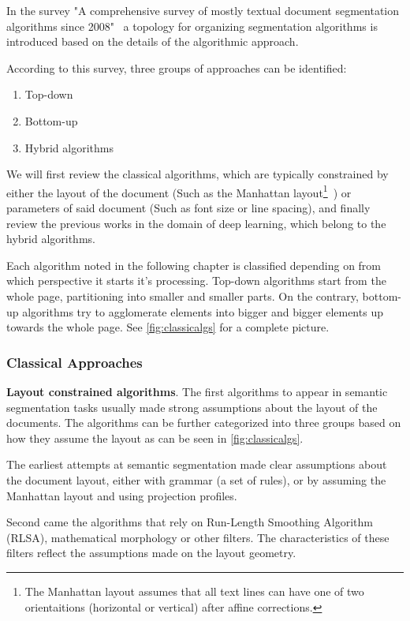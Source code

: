 \documentclass[oneside, english, bibtex]{kththesis}
\begin{document}
In the survey "A comprehensive survey of mostly textual document segmentation algorithms since 2008"~\cite{ESKENAZI20171} a topology for organizing segmentation algorithms is introduced based on the details of the algorithmic approach.

According to this survey, three groups of approaches can be identified:

\begin{enumerate}
\item Top-down
\item Bottom-up
\item Hybrid algorithms
\end{enumerate}

We will first review the classical algorithms, which are typically constrained by either the layout of the document (Such as the Manhattan layout\footnote{The Manhattan layout assumes that all text lines can have one of two orientaitions (horizontal or vertical) after affine corrections.}~\cite{395720}) or parameters of said document (Such as font size or line spacing), and finally review the previous works in the domain of deep learning, which belong to the hybrid algorithms.

Each algorithm noted in the following chapter is classified depending on from which perspective it starts it's processing. Top-down algorithms start from the whole page, partitioning into smaller and smaller parts. On the contrary, bottom-up algorithms try to agglomerate elements into bigger and bigger elements up towards the whole page. See \autoref{fig:classicalgs} for a complete picture.

\subsubsection{Classical Approaches}

\textbf{Layout constrained algorithms}. The first algorithms to appear in semantic segmentation tasks usually made strong assumptions about the layout of the documents. The algorithms can be further categorized into three groups based on how they assume the layout as can be seen in \autoref{fig:classicalgs}.

The earliest attempts at semantic segmentation made clear assumptions about the document layout, either with grammar (a set of rules), or by assuming the Manhattan layout and using projection profiles.

Second came the algorithms that rely on Run-Length Smoothing Algorithm (RLSA), mathematical morphology or other filters. The characteristics of these filters reflect the assumptions made on the layout geometry.
\end{document}
